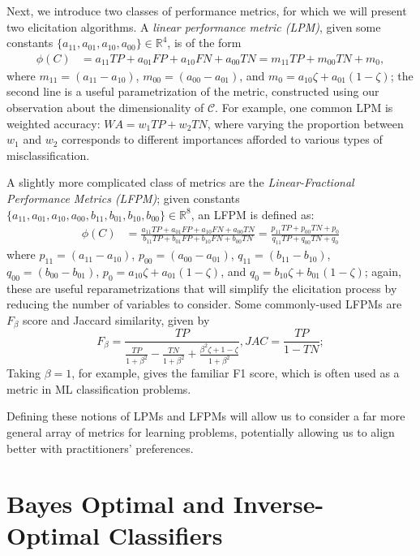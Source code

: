 \documentclass[
  letterpaper,
  numbers=noenddot,
  DIV=11,
  oneside]{scrreprt}
\theoremstyle{remark}
\begin{document}
Next, we introduce two classes of performance metrics, for which we will
present two elicitation algorithms. A \emph{linear performance metric
(LPM)}, given some constants
\(\{a_{11}, a_{01}, a_{10}, a_{00}\} \in \mathbb{R}^{4}\), is of the
form \[\begin{aligned}
\phi(C) & = a_{11} T P + a_{01} F P + a_{10} F N + a_{00} TN  = m_{11} T P + m_{00} T N + m_{0},
\end{aligned}\] where \(m_{11} = (a_{11} - a_{10})\),
\(m_{00} = (a_{00} - a_{01})\), and
\(m_{0} = a_{10} \zeta + a_{01} (1 - \zeta)\); the second line is a
useful parametrization of the metric, constructed using our observation
about the dimensionality of \(\mathcal{C}\). For example, one common LPM
is weighted accuracy: \(WA = w_1TP + w_2TN\), where varying the
proportion between \(w_1\) and \(w_2\) corresponds to different
importances afforded to various types of misclassification.

A slightly more complicated class of metrics are the
\emph{Linear-Fractional Performance Metrics (LFPM)}; given constants
\(\{a_{11}, a_{01}, a_{10}, a_{00}, b_{11}, b_{01}, b_{10}, b_{00}\} \in \mathbb{R}^{8}\),
an LFPM is defined as: \[\begin{aligned}
\phi(C) & = \frac{a_{11} T P + a_{01} F P + a_{10} F N + a_{00} T N}{b_{11} T P + b_{01} F P + b_{10} F N + b_{00} T N} = \frac{p_{11} T P + p_{00} T N + p_{0}}{q_{11} T P + q_{00} T N + q_{0}}
\end{aligned}\] where \(p_{11} = (a_{11} - a_{10})\),
\(p_{00} = (a_{00} - a_{01})\), \(q_{11} = (b_{11} - b_{10})\),
\(q_{00} = (b_{00} - b_{01})\),
\(p_{0} = a_{10} \zeta + a_{01} (1 - \zeta)\), and
\(q_{0} = b_{10} \zeta + b_{01} (1 - \zeta)\); again, these are useful
reparametrizations that will simplify the elicitation process by
reducing the number of variables to consider. Some commonly-used LFPMs
are \(F_\beta\) score and Jaccard similarity, given by
\[F_{\beta}=\frac{T P}{\frac{T P}{1+\beta^{2}}-\frac{T N}{1+\beta^{2}}+\frac{\beta^{2} \zeta+1-\zeta}{1+\beta^{2}}}, J A C=\frac{T P}{1-T N};\]
Taking \(\beta = 1\), for example, gives the familiar F1 score, which is
often used as a metric in ML classification problems.

Defining these notions of LPMs and LFPMs will allow us to consider a far
more general array of metrics for learning problems, potentially
allowing us to align better with practitioners' preferences.

\section{Bayes Optimal and Inverse-Optimal
Classifiers}\label{bayes-optimal-and-inverse-optimal-classifiers}
\end{document}
